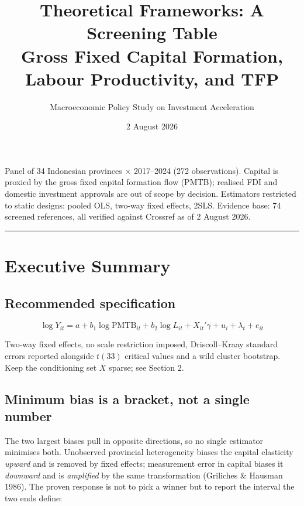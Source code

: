 \documentclass[11pt,a4paper]{article}
\title{\vspace{-1.5cm}\textbf{Theoretical Frameworks: A Screening Table}\\[0.3em]
\large Gross Fixed Capital Formation, Labour Productivity, and TFP}
\author{Macroeconomic Policy Study on Investment Acceleration}
\date{2 August 2026}
\begin{document}
\maketitle
\thispagestyle{empty}

\vspace{-0.8em}

\begin{center}
\begin{minipage}{0.93\textwidth}
\small
Panel of 34 Indonesian provinces $\times$ 2017--2024 (272 observations). Capital is proxied by
the gross fixed capital formation flow (PMTB); realised FDI and domestic investment approvals
are out of scope by decision. Estimators restricted to static designs: pooled OLS, two-way
fixed effects, 2SLS. Evidence base: 74 screened references, all verified against Crossref as
of 2 August 2026.
\end{minipage}
\end{center}

\vspace{0.4em}
\hrule
\vspace{1em}

\section*{Executive Summary}

\subsection*{Recommended specification}

\begin{equation*}
\log Y_{it} = a + b_1 \log \mathrm{PMTB}_{it} + b_2 \log L_{it}
+ X_{it}'\gamma + u_i + \lambda_t + e_{it}
\end{equation*}

Two-way fixed effects, no scale restriction imposed, Driscoll--Kraay standard errors reported
alongside $t(33)$ critical values and a wild cluster bootstrap. Keep the conditioning set
$X$ sparse; see Section 2.

\subsection*{Minimum bias is a bracket, not a single number}

The two largest biases pull in opposite directions, so no single estimator minimises both.
Unobserved provincial heterogeneity biases the capital elasticity \emph{upward} and is removed
by fixed effects; measurement error in capital biases it \emph{downward} and is
\emph{amplified} by the same transformation (Griliches \& Hausman 1986). The proven response is
not to pick a winner but to report the interval the two ends define:
\end{document}
